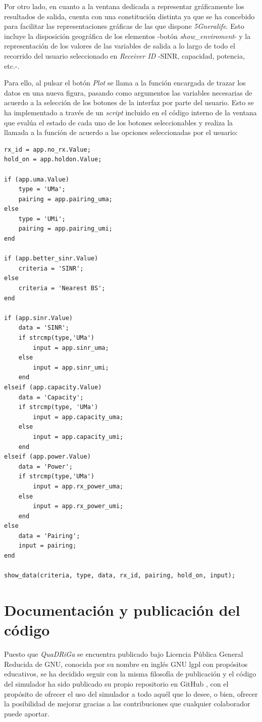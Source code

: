 Por otro lado, en cuanto a la ventana dedicada a representar gráficamente los resultados de salida, cuenta con una constitución distinta ya que se ha concebido para facilitar las representaciones gráficas de las que dispone \textit{5Gneralife}. Esto incluye la disposición geográfica de los elementos -botón \textit{show\_enviroment}- y la representación de los valores de las variables de salida a lo largo de todo el recorrido del usuario seleccionado en \textit{Receiver ID} -SINR, capacidad, potencia, etc.-.

Para ello, al pulsar el botón \textit{Plot} se llama a la función encargada de trazar los datos en una nueva figura, pasando como argumentos las variables necesarias de acuerdo a la selección de los botones de la interfaz por parte del usuario. Esto se ha implementado a través de un \textit{script} incluido en el código interno de la ventana que evalúa el estado de cada uno de los botones seleccionables y realiza la llamada a la función de acuerdo a las opciones seleccionadas por el usuario:

\begin{lstlisting}[style=Matlab-editor, basicstyle=\tiny]
rx_id = app.no_rx.Value;
hold_on = app.holdon.Value;

if (app.uma.Value)
    type = 'UMa';
    pairing = app.pairing_uma;
else
    type = 'UMi';
    pairing = app.pairing_umi;
end

if (app.better_sinr.Value)
    criteria = 'SINR';
else
    criteria = 'Nearest BS';
end

if (app.sinr.Value)
    data = 'SINR';
    if strcmp(type,'UMa')
        input = app.sinr_uma;
    else
        input = app.sinr_umi;
    end
elseif (app.capacity.Value)
    data = 'Capacity';
    if strcmp(type, 'UMa')
        input = app.capacity_uma;
    else
        input = app.capacity_umi;
    end
elseif (app.power.Value)
    data = 'Power';
    if strcmp(type,'UMa')
        input = app.rx_power_uma;
    else
        input = app.rx_power_umi;
    end
else
    data = 'Pairing';
    input = pairing;
end

show_data(criteria, type, data, rx_id, pairing, hold_on, input);
\end{lstlisting}

\section{Documentación y publicación del código}

Puesto que \textit{QuaDRiGa} se encuentra publicado bajo Licencia Pública General Reducida de GNU, conocida por su nombre en inglés GNU \ac{lgpl} con propósitos educativos, se ha decidido seguir con la misma filosofía de publicación y el código del simulador ha sido publicado su propio repositorio en GitHub \cite{publicacion}, con el propósito de ofrecer el uso del simulador a todo aquél que lo desee, o bien, ofrecer la posibilidad de mejorar gracias a las contribuciones que cualquier colaborador puede aportar.

